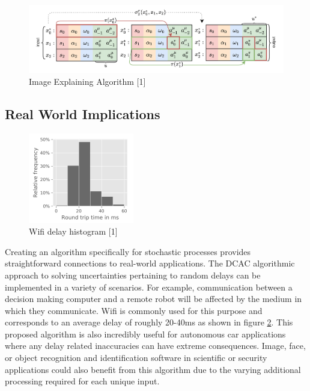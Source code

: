 \documentclass{article} %
\begin{document}
\begin{figure}[H]
\begin{center}
\includegraphics[scale=0.2]{images/fig4FromPaper}
\end{center}
\caption{Image Explaining Algorithm [1]}
\label{imageExplainAlorithm}
\end{figure}

\subsection{Real World Implications}

\begin{figure}[H]
\begin{center}
\includegraphics[scale=1]{images/wifilatency.png}
\end{center}
\caption{Wifi delay histogram  [1]}
\label{wifiHistogram}
\end{figure}

Creating an algorithm specifically for stochastic processes provides straightforward connections to real-world applications. The DCAC algorithmic approach to solving uncertainties pertaining to random delays can be implemented in a variety of scenarios. For example, communication between a decision making computer and a remote robot will be affected by the medium in which they communicate. Wifi is commonly used for this purpose and corresponds to an average delay of roughly 20-40ms as shown in figure \ref{wifiHistogram}. This proposed algorithm is also incredibly useful for autonomous car applications where any delay related inaccuracies can have extreme consequences. Image, face, or object recognition and identification software in scientific or security applications could also benefit from this algorithm due to the varying additional processing required for each unique input.
\end{document}
